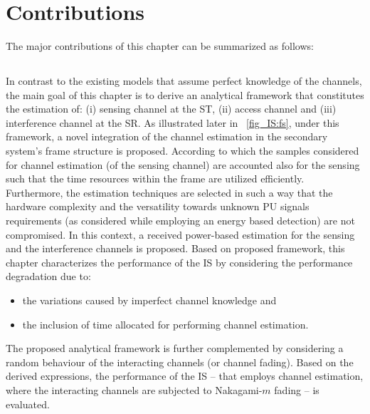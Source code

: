 \section{Contributions}
The major contributions of this chapter can be summarized as follows:
\subsection{}
In contrast to the existing models that assume perfect knowledge of the channels, the main goal of this chapter is to derive an analytical framework that constitutes the estimation of: (i) sensing channel at the ST, (ii) access channel and (iii) interference channel at the SR. As illustrated later in \figurename~\ref{fig_IS:fs}, under this framework, a novel integration of the channel estimation in the secondary system's frame structure is proposed. According to which the samples considered for channel estimation (of the sensing channel) are accounted also for the sensing such that the time resources within the frame are utilized efficiently. Furthermore, the estimation techniques are selected in such a way that the hardware complexity and the versatility towards unknown PU signals requirements (as considered while employing an energy based detection) are not compromised. In this context, a received power-based estimation for the sensing and the interference channels is proposed. Based on proposed framework, this chapter characterizes the performance of the IS by considering the performance degradation due to: \begin{itemize} \item the variations caused by imperfect channel knowledge and \item the inclusion of time allocated for performing channel estimation. \end{itemize} 
The proposed analytical framework is further complemented by considering a random behaviour of the interacting channels (or channel fading). Based on the derived expressions, the performance of the IS -- that employs channel estimation, where the interacting channels are subjected to Nakagami-$m$ fading -- is evaluated.


